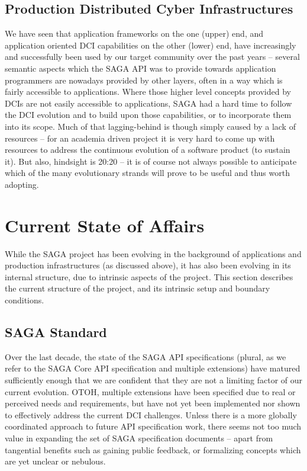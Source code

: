 \documentclass{article}
\newcommand{\B}[1]{\textbf{#1}}
\newcommand{\todo}[1]{{\textcolor{red}{\B{TODO:} #1 }}}
\begin{document}
\subsection{Production Distributed Cyber Infrastructures}

  We have seen that application frameworks on the one (upper) end, and
  application oriented DCI capabilities on the other (lower) end, have
  increasingly and successfully been used by our target community over
  the past years -- several semantic aspects which the SAGA API was to
  provide towards application programmers are nowadays provided by
  other layers, often in a way which is fairly accessible to
  applications.  Where those higher level concepts provided by DCIs
  are not easily accessible to applications, SAGA had a hard time to
  follow the DCI evolution and to build upon those capabilities, or to
  incorporate them into its scope.  Much of that lagging-behind is
  though simply caused by a lack of resources -- for an academia
  driven project it is very hard to come up with resources to address
  the continuous evolution of a software product (to sustain it).  But
  also, hindsight is 20:20 -- it is of course not always possible to
  anticipate which of the many evolutionary strands will prove to be
  useful and thus worth adopting.


%


\section{Current State of Affairs}
\label{sec:state}


 While the SAGA project has been evolving in the background of
 applications and production infrastructures (as discussed above), it
 has also been evolving in its internal structure, due to intrinsic
 aspects of the project.  This section describes the current structure
 of the project, and its intrinsic setup and boundary conditions.



\subsection{SAGA Standard}

  Over the last decade, the state of the SAGA API specifications
  (plural, as we refer to the SAGA Core API specification and multiple
  extensions) have matured sufficiently enough that we are confident
  that they are not a limiting factor of our current evolution.  OTOH,
  multiple extensions have been specified due to real or perceived
  needs and requirements, but have not yet been implemented nor shown
  to effectively address the current DCI challenges.  Unless there is
  a more globally coordinated approach to future API specification
  work, there seems not too much value in expanding the set of SAGA
  specification documents -- apart from tangential benefits such as
  gaining public feedback, or formalizing concepts which are yet
  unclear or nebulous.
\end{document}

